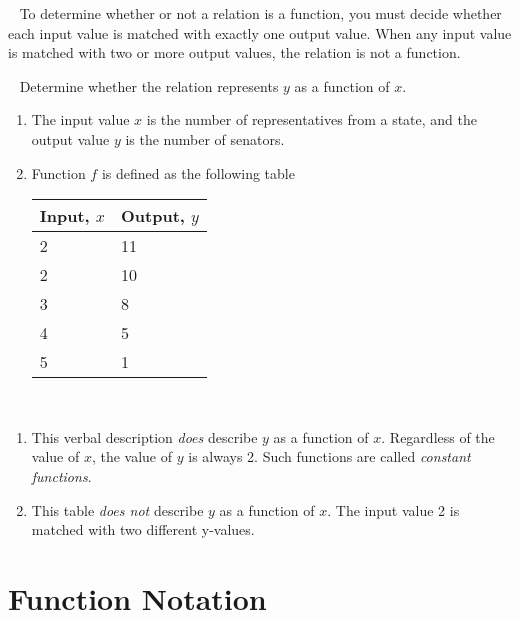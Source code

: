 ~\newline
To determine whether or not a relation is a function, you must decide whether each input value is matched with exactly one output value. When any input value is matched with two or more output values, the relation is not a function.

\begin{example}~\newline
	Determine whether the relation represents $y$ as a function of $x$. \cite{ci}
	\begin{enumerate}
		\item The input value $x$ is the number of representatives from a state, and the output value $y$ is the number of senators.
		\item Function $f$ is defined as the following table
		      \begin{table}[h]
		      	\centering
		      	\begin{tabular}{l l}
		      		\toprule
		      		\textbf{Input, $x$} & \textbf{Output, $y$} \\
		      		\midrule
		      		2         & 11      \\
		      		2         & 10      \\
		      		3         & 8       \\
		      		4         & 5       \\
		      		5         & 1       \\
		      		\bottomrule
		      	\end{tabular}
		      \end{table}
	\end{enumerate} 
	\begin{solution}~\newline
		\begin{enumerate}
			\item  This verbal description \textit{does} describe $y$ as a function of $x$. Regardless of the value of $x$, the value of $y$ is always 2. Such functions are called \textit{constant functions}.
			\item  This table \textit{does not} describe $y$ as a function of $x$. The input value 2 is matched with two different y-values.
		\end{enumerate}    
	\end{solution}
\end{example}

\section{Function Notation}

